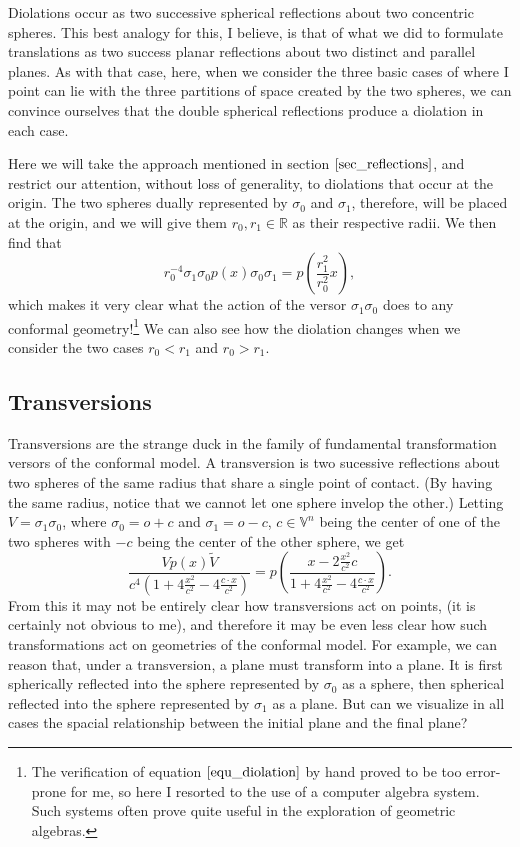 \documentclass[12pt]{article}
\newcommand{\V}{\mathbb{V}}
\newcommand{\R}{\mathbb{R}}
\newcommand{\nvao}{o}
\begin{document}
Diolations occur as two successive spherical reflections about two concentric
spheres.  This best analogy for this, I believe, is that of what we did to formulate
translations as two success planar reflections about two distinct and parallel planes.
As with that case, here, when we consider the three basic cases of where I point can lie
with the three partitions of space created by the two spheres, we can convince ourselves
that the double spherical reflections produce a diolation in each case.

Here we will take the approach mentioned in section $\eqref{sec_reflections}$,
and restrict our attention, without loss of generality, to diolations that occur at the
origin.  The two spheres dually represented by $\sigma_0$ and $\sigma_1$, therefore,
will be placed at the origin, and we will give them $r_0,r_1\in\R$ as their respective radii.
We then find that
\begin{equation}\label{equ_diolation}
r_0^{-4}\sigma_1\sigma_0 p(x)\sigma_0\sigma_1 = p\left(\frac{r_1^2}{r_0^2}x\right),
\end{equation}
which makes it very clear what the action of the versor $\sigma_1\sigma_0$ does
to any conformal geometry!\footnote{The verification of equation $\eqref{equ_diolation}$
by hand proved to be too error-prone for me, so here I resorted to the use of a computer
algebra system.  Such systems often prove quite useful in the exploration of geometric algebras.}
We can also see how the diolation changes when
we consider the two cases $r_0<r_1$ and $r_0>r_1$.

\subsection{Transversions}


Transversions are the strange duck in the family of fundamental
transformation versors of the conformal model.  A transversion is two
sucessive reflections about two spheres of the same radius that share a single point
of contact.  (By having the same radius, notice that we cannot let one sphere
invelop the other.)
Letting $V=\sigma_1\sigma_0$, where $\sigma_0=\nvao+c$
and $\sigma_1=\nvao-c$, $c\in\V^n$ being the center of one of the two spheres
with $-c$ being the center of the other sphere, we get
\begin{equation*}
\frac{Vp(x)\tilde{V}}{c^4(1+4\frac{x^2}{c^2}-4\frac{c\cdot x}{c^2})}
= p\left(\frac{x-2\frac{x^2}{c^2}c}{1+4\frac{x^2}{c^2}-4\frac{c\cdot x}{c^2}}\right).
\end{equation*}
From this it may not be entirely clear how transversions act
on points, (it is certainly not obvious to me), and therefore it may be even less clear how such transformations
act on geometries of the conformal model.  For example, we can reason
that, under a transversion, a plane must transform into a plane.  It is
first spherically reflected into the sphere represented by $\sigma_0$
as a sphere, then spherical reflected into the sphere represented by $\sigma_1$
as a plane.  But can we visualize in all cases the spacial relationship between
the initial plane and the final plane?
\end{document}
